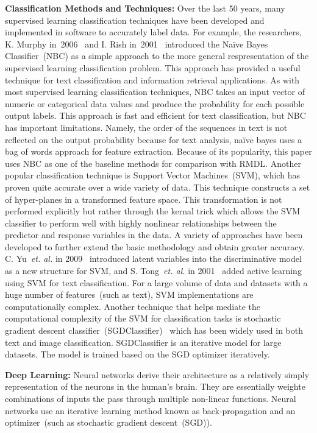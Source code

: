 \documentclass[sigconf, final]{acmart}
\begin{document}
\textbf{Classification Methods and Techniques:}\label{subsec:related2} 
Over the last 50 years, many supervised learning classification techniques have been developed and implemented in software to accurately label  data. For example, the researchers, K. Murphy in~2006~\cite{murphy2006naive} and I. Rish in~2001~\cite{rish2001empirical} introduced the Na\"ive Bayes Classifier~(NBC) as a simple approach to the more general respresentation of the supervised learning classification problem. This approach has provided a useful technique for text classification and information retrieval applications. As with most supervised learning classification techniques, NBC takes an input vector of numeric or categorical data values and produce the probability for each possible output labels. This approach is fast and efficient for text classification, but NBC has important limitations. Namely, the order of the sequences in text is not reflected on the output probability because for text analysis, na\"ive bayes uses a bag of words approach for feature extraction. Because of its popularity, this paper uses NBC as one of the baseline methods for comparison with RMDL. Another  popular classification technique is Support Vector Machines~(SVM), which has proven quite accurate over a wide variety of data. This technique constructs a set of hyper-planes in a transformed feature space. This transformation is not performed explicitly but rather through the kernal trick which allows the SVM classifier to perform well with highly nonlinear relationships between the predictor and response variables in the data.  A variety of approaches have been developed to further extend the basic methodology and obtain greater accuracy. C. Yu~\textit{et. al.} in 2009~\cite{yu2009learning} introduced  latent variables into the discriminative model as a new structure for SVM, and S. Tong~\textit{et. al.} in 2001~\cite{tong2001support} added active learning using SVM for text classification. For a large volume of data and  datasets with a huge number of features~(such as text), SVM implementations are computationally complex. Another technique that helps mediate the computational complexity of the SVM for classification tasks is stochastic gradient descent classifier~(SGDClassifier)~\cite{kabir2015bangla} which has been widely used in both text and image classification. SGDClassifier is an iterative model for large datasets. The model is trained based on the SGD optimizer iteratively. 

\textbf{Deep Learning:}\label{subsec:related3}
Neural networks derive their architecture as a relatively simply representation of the neurons in the human's brain. They are essentially weighte combinations of inputs the pass through multiple non-linear functions. Neural networks use an iterative learning method known as back-propagation and an optimizer~(such as stochastic gradient descent~(SGD)). 
\end{document}
